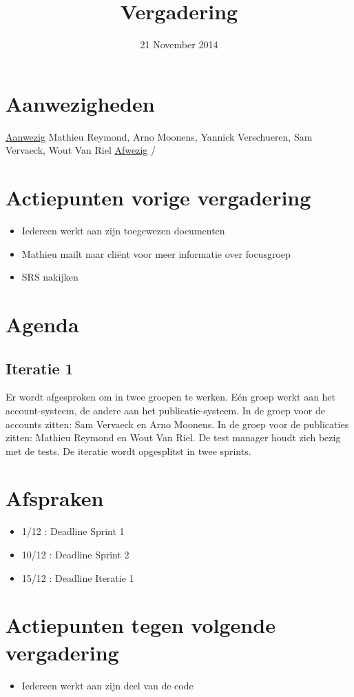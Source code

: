 \title{Vergadering}
\author{}
\date{21 November 2014}



\maketitle

\section{Aanwezigheden}
\underline{Aanwezig}  \newline
Mathieu Reymond, Arno Moonens, Yannick Verschueren, Sam Vervaeck, Wout Van Riel
\newline
\underline{Afwezig} \newline
/
\section{Actiepunten vorige vergadering}
\begin{itemize}
\item Iedereen werkt aan zijn toegewezen documenten 
\item Mathieu mailt naar cliënt voor meer informatie over focusgroep
\item SRS nakijken
\end{itemize}

\section{Agenda}
\subsection{Iteratie 1}
Er wordt afgesproken om in twee groepen te werken. 
Eén groep werkt aan het account-systeem, de andere aan het publicatie-systeem.
In de groep voor de accounts zitten: Sam Vervaeck en Arno Moonens.
In de groep voor de publicaties zitten: Mathieu Reymond en Wout Van Riel.
De test manager houdt zich bezig met de tests.
De iteratie wordt opgesplitst in twee sprints.

\section{Afspraken}
\begin{itemize}
\item 1/12 : Deadline Sprint 1
\item 10/12 : Deadline Sprint 2
\item 15/12 : Deadline Iteratie 1
\end{itemize}

\section{Actiepunten tegen volgende vergadering}
\begin{itemize}
\item Iedereen werkt aan zijn deel van de code
\end{itemize}

